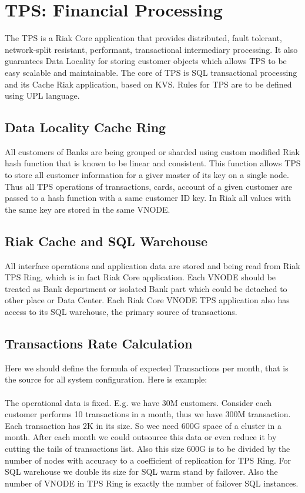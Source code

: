 \section{TPS: Financial Processing}

The TPS is a Riak Core application that provides distributed,
fault tolerant, network-split resistant, performant,
transactional intermediary processing. It also guarantees
Data Locality for storing customer objects which allows
TPS to be easy scalable and maintainable. The core of TPS
is SQL transactional processing and its Cache Riak application,
based on KVS. Rules for TPS are to be defined using UPL language.

\subsection{Data Locality Cache Ring}

All customers of Banks are being grouped or sharded using custom modified Riak hash function that is known to be linear and consistent. This function allows TPS to store all customer information for a giver master of its key on a single node. Thus all TPS operations of transactions, cards, account of a given customer are passed to a hash function with a same customer ID key. In Riak all values with the same key are stored in the same VNODE.

\subsection{Riak Cache and SQL Warehouse}

All interface operations and application data are stored and being read from Riak TPS Ring, which is in fact Riak Core application. Each VNODE should be treated as Bank department or isolated Bank part which could be detached to other place or Data Center. Each Riak Core VNODE TPS application also has access to its SQL warehouse, the primary source of transactions.

\subsection{Transactions Rate Calculation}

Here we should define the formula of expected Transactions per month, that is the source for all system configuration. Here is example:

\paragraph{}
The operational data is fixed. E.g. we have 30M customers. Consider each customer performs 10 transactions in a month, thus we have 300M transaction. Each transaction has 2K in its size. So wee need 600G space of a cluster in a month. After each month we could outsource this data or even reduce it by cutting the tails of transactions list. Also this size 600G is to be divided by the number of nodes with accuracy to a coefficient of replication for TPS Ring. For SQL warehouse we double its size for SQL warm stand by failover. Also the number of VNODE in TPS Ring is exactly the number of failover SQL instances.


